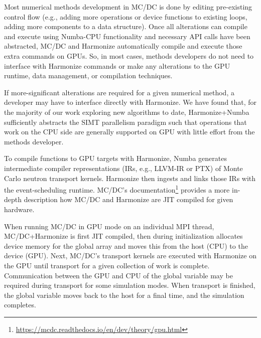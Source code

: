 Most numerical methods development in MC/DC is done by editing pre-existing control flow (e.g., adding more operations or device functions to existing loops, adding more components to a data structure).
Once all alterations can compile and execute using Numba-CPU functionality and necessary API calls have been abstracted, MC/DC and Harmonize automatically compile and execute those extra commands on GPUs.
So, in most cases, methods developers do not need to interface with Harmonize commands or make any alterations to the GPU runtime, data management, or compilation techniques.

If more-significant alterations are required for a given numerical method, a developer may have to interface directly with Harmonize.
We have found that, for the majority of our work exploring new algorithms to date, Harmonize+Numba sufficiently abstracts the SIMT parallelism paradigm such that operations that work on the CPU side are generally supported on GPU with little effort from the methods developer.

To compile functions to GPU targets with Harmonize, Numba generates intermediate compiler representations (IRs, e.g., LLVM-IR or PTX) of Monte Carlo neutron transport kernels. 
Harmonize then ingests and links those IRs with the event-scheduling runtime.
MC/DC's documentation\footnote{\url{https://mcdc.readthedocs.io/en/dev/theory/gpu.html}} provides a more in-depth description how MC/DC and Harmonize are JIT compiled for given hardware.

When running MC/DC in GPU mode on an individual MPI thread, MC/DC+Harmonize is first JIT compiled, then  during initialization allocates device memory for the global array and moves this from the host (CPU) to the device (GPU).
Next, MC/DC's transport kernels are executed with Harmonize on the GPU until transport for a given collection of work is complete.
Communication between the GPU and CPU of the global variable may be required during transport for some simulation modes.
When transport is finished, the global variable moves back to the host for a final time, and the simulation completes.

